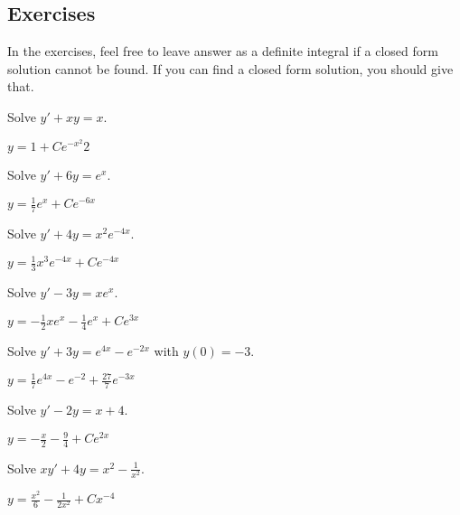 
\subsection{Exercises}

In the exercises, feel free to leave answer as a definite integral if a
closed form solution cannot be found.  If you can find a closed form
solution, you should give that.

\begin{exercise}
Solve $y' + xy = x$.
\end{exercise}
\comboSol{%
}
{%
$y = 1 + Ce^{-x^2}{2}$
}

\begin{exercise}
Solve $y' + 6y = e^x$.
\end{exercise}
\comboSol{%
}
{%
$y = \frac{1}{7}e^x + Ce^{-6x}$
}

\begin{exercise}
Solve $y' + 4y = x^2e^{-4x}$.
\end{exercise}
\comboSol{%
}
{%
$y = \frac{1}{3}x^3e^{-4x} + Ce^{-4x}$
}

\begin{exercise}
Solve $y' - 3y = xe^x$.
\end{exercise}
\comboSol{%
}
{%
$y = -\frac{1}{2}xe^{x} - \frac{1}{4}e^x + Ce^{3x}$
}

\begin{exercise}
Solve $y' + 3y = e^{4x} - e^{-2x}$ with $y(0) = -3$.
\end{exercise}
\comboSol{%
}
{%
$y = \frac{1}{7}e^{4x} - e^{-2} + \frac{27}{7}e^{-3x}$
}

\begin{exercise}
Solve $y' - 2y = x + 4$.
\end{exercise}
\comboSol{%
}
{%
$y = -\frac{x}{2} - \frac{9}{4} + Ce^{2x}$
}

\begin{exercise}
Solve $xy' + 4y = x^2 - \frac{1}{x^2}$.
\end{exercise}
\comboSol{%
}
{%
$y = \frac{x^2}{6} - \frac{1}{2x^2} + Cx^{-4}$
}

